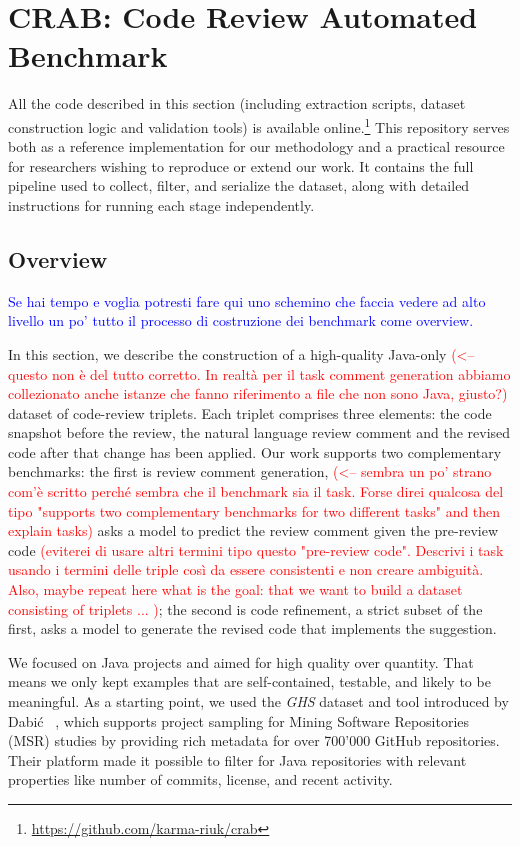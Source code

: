 \section{CRAB: Code Review Automated Benchmark}

All the code described in this section (including extraction scripts, dataset construction logic and
validation tools) is available online.\footnote{\url{https://github.com/karma-riuk/crab}} This
repository serves both as a reference implementation for our methodology and a practical resource
for researchers wishing to reproduce or extend our work. It contains the full pipeline used to
collect, filter, and serialize the dataset, along with detailed instructions for running each stage
independently.

\subsection{Overview}

\textcolor{blue}{Se hai tempo e voglia potresti fare qui uno schemino che faccia vedere ad alto livello un po' tutto il processo di costruzione dei benchmark come overview.}

In this section, we describe the construction of a high-quality Java-only \textcolor{red}{(<-- questo non è del tutto corretto. In realtà per il task comment generation abbiamo collezionato anche istanze che fanno riferimento a file che non sono Java, giusto?)} dataset of code-review
triplets. Each triplet comprises three elements: the code snapshot before the review, the natural
language review comment and the revised code after that change has been applied. Our work supports
two complementary benchmarks: the first is review comment generation, \textcolor{red}{(<-- sembra un po' strano com'è scritto perché sembra che il benchmark sia il task. Forse direi qualcosa del tipo "supports two complementary benchmarks for two different tasks" and then explain tasks)} asks a model to predict the
review comment given the pre-review code \textcolor{red}{(eviterei di usare altri termini tipo questo "pre-review code". Descrivi i task usando i termini delle triple così da essere consistenti e non creare ambiguità. Also, maybe repeat here what is the goal: that we want to build a dataset consisting of triplets ... )}; the second is code refinement, a strict subset of the
first, asks a model to generate the revised code that implements the suggestion.


We focused on Java projects and aimed for high quality over quantity. That means we only kept
examples that are self-contained, testable, and likely to be meaningful. As a starting point, we
used the \textit{GHS} dataset and tool introduced by Dabić \etal~\cite{Dabic:msr2021data}, which
supports project sampling for Mining Software Repositories (MSR) studies by providing rich metadata
for over 700'000 GitHub repositories. Their platform made it possible to filter for Java
repositories with relevant properties like number of commits, license, and recent activity.

